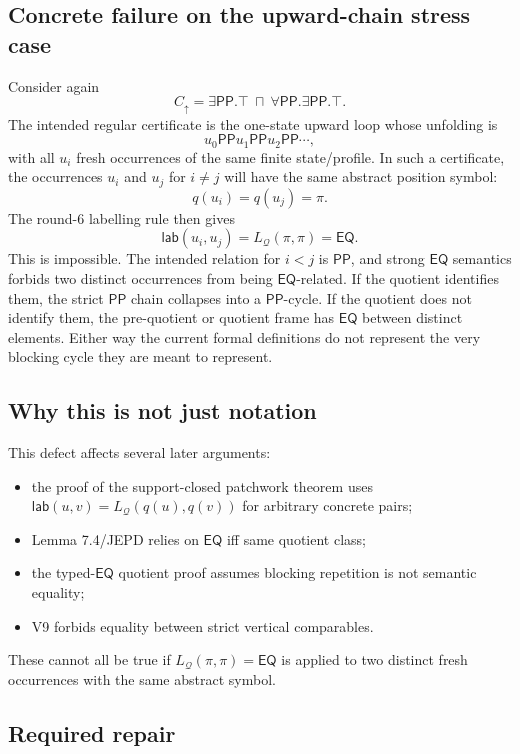 \documentclass[11pt]{article}
\newcommand{\EQ}{\mathsf{EQ}}
\newcommand{\PP}{\mathsf{PP}}
\newcommand{\Q}{\mathcal Q}
\newcommand{\lab}{\mathsf{lab}}
\begin{document}
\subsection{Concrete failure on the upward-chain stress case}

Consider again
\[
  C_{\uparrow}=\exists\PP.\top\ \sqcap\ \forall\PP.\exists\PP.\top.
\]
The intended regular certificate is the one-state upward loop whose unfolding is
\[
  u_0\PP u_1\PP u_2\PP\cdots,
\]
with all $u_i$ fresh occurrences of the same finite state/profile.  In such a
certificate, the occurrences $u_i$ and $u_j$ for $i\ne j$ will have the same
abstract position symbol:
\[
  q(u_i)=q(u_j)=\pi.
\]
The round-6 labelling rule then gives
\[
  \lab(u_i,u_j)=L_{\Q}(\pi,
  \pi)=\EQ.
\]
This is impossible.  The intended relation for $i<j$ is $\PP$, and strong
$\EQ$ semantics forbids two distinct occurrences from being $\EQ$-related.
If the quotient identifies them, the strict $\PP$ chain collapses into a
$\PP$-cycle.  If the quotient does not identify them, the pre-quotient or
quotient frame has $\EQ$ between distinct elements.  Either way the current
formal definitions do not represent the very blocking cycle they are meant to
represent.

\subsection{Why this is not just notation}

This defect affects several later arguments:
\begin{itemize}[leftmargin=2em]
  \item the proof of the support-closed patchwork theorem uses
        $\lab(u,v)=L_{\Q}(q(u),q(v))$ for arbitrary concrete pairs;
  \item Lemma 7.4/JEPD relies on $\EQ$ iff same quotient class;
  \item the typed-$\EQ$ quotient proof assumes blocking repetition is not
        semantic equality;
  \item V9 forbids equality between strict vertical comparables.
\end{itemize}
These cannot all be true if $L_{\Q}(\pi,\pi)=\EQ$ is applied to two distinct
fresh occurrences with the same abstract symbol.

\subsection{Required repair}
\end{document}
